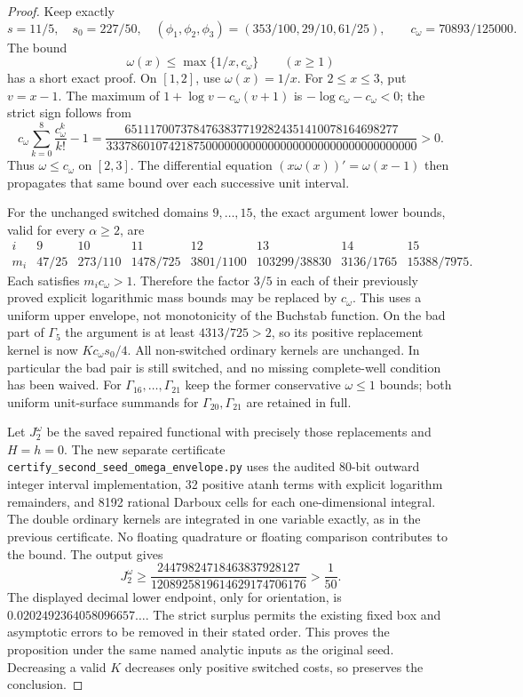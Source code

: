 \documentclass[11pt]{article}
\begin{document}
\begin{proof}
Keep exactly
\[
 s=11/5,\quad s_0=227/50,\quad
 (\phi_1,\phi_2,\phi_3)=(353/100,29/10,61/25),
 \qquad c_\omega=70893/125000.
\]
The bound
\[
 \omega(x)\le\max\{1/x,c_\omega\}\qquad(x\ge1)
\]
has a short exact proof.  On $[1,2]$, use $\omega(x)=1/x$.
For $2\le x\le3$, put $v=x-1$.  The maximum of
$1+\log v-c_\omega(v+1)$ is
$-\log c_\omega-c_\omega<0$; the strict sign follows from
\[
 c_\omega\sum_{k=0}^{8}\frac{c_\omega^k}{k!}-1
 =\frac{65111700737847638377192824351410078164698277}
 {33378601074218750000000000000000000000000000000000}>0.
\]
Thus $\omega\le c_\omega$ on $[2,3]$.  The differential equation
$(x\omega(x))'=\omega(x-1)$ then propagates that same bound over
each successive unit interval.

For the unchanged switched domains $9,\ldots,15$, the exact
argument lower bounds, valid for every $\alpha\ge2$, are
\[
\begin{array}{c|rrrrrrr}
i&9&10&11&12&13&14&15\\\hline
m_i&47/25&273/110&1478/725&3801/1100&103299/38830&3136/1765&15388/7975.
\end{array}
\]
Each satisfies $m_i c_\omega>1$.  Therefore the factor $3/5$ in
each of their previously proved explicit logarithmic mass bounds
may be replaced by $c_\omega$.  This uses a uniform upper envelope,
not monotonicity of the Buchstab function.
On the bad part of $\Gamma_5$ the argument is at least
$4313/725>2$, so its positive replacement kernel is now
$Kc_\omega s_0/4$.
All non-switched ordinary kernels are unchanged.  In particular
the bad pair is still switched, and no missing complete-well
condition has been waived.
For $\Gamma_{16},\ldots,\Gamma_{21}$ keep the former conservative
$\omega\le1$ bounds; both uniform unit-surface summands for
$\Gamma_{20},\Gamma_{21}$ are retained in full.

Let $J_2^{\omega}$ be the saved repaired functional with precisely
those replacements and $H=h=0$.  The new separate certificate
\texttt{certify\_second\_seed\_omega\_envelope.py} uses the audited
80-bit outward integer interval implementation, 32 positive atanh
terms with explicit logarithm remainders, and 8192 rational
Darboux cells for each one-dimensional integral.  The double
ordinary kernels are integrated in one variable exactly, as in
the previous certificate.  No floating quadrature or floating
comparison contributes to the bound.
The output gives
\begin{equation}\label{eq:second-seed-omega-exact-bound}
 J_2^{\omega}\ge
 \frac{24479824718463837928127}
      {1208925819614629174706176}
 >\frac1{50}.
\end{equation}
The displayed decimal lower endpoint, only for orientation, is
$0.0202492364058096657\ldots$.
The strict surplus permits the existing fixed box and asymptotic
errors to be removed in their stated order.  This proves the
proposition under the same named analytic inputs as the original
seed.  Decreasing a valid $K$ decreases only positive switched
costs, so preserves the conclusion.
\end{proof}
\end{document}
